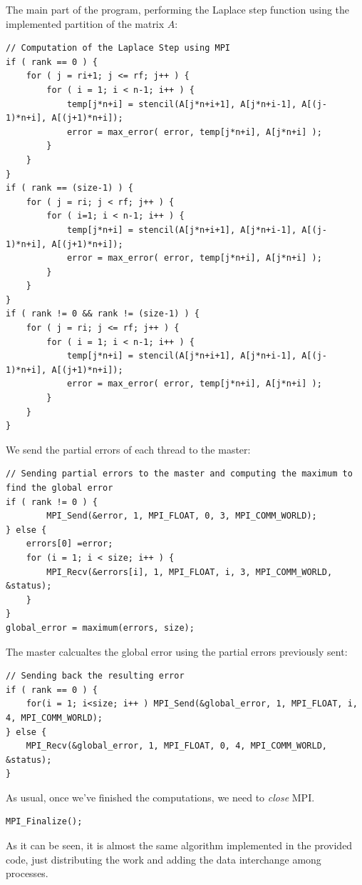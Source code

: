 The main part of the program, performing the Laplace step function using the implemented partition of the matrix $A$:
\begin{lstlisting}[firstnumber=106]
// Computation of the Laplace Step using MPI
if ( rank == 0 ) {
	for ( j = ri+1; j <= rf; j++ ) {
		for ( i = 1; i < n-1; i++ ) {
			temp[j*n+i] = stencil(A[j*n+i+1], A[j*n+i-1], A[(j-1)*n+i], A[(j+1)*n+i]);
			error = max_error( error, temp[j*n+i], A[j*n+i] );
		}
	}
}
if ( rank == (size-1) ) {
	for ( j = ri; j < rf; j++ ) {
		for ( i=1; i < n-1; i++ ) {
			temp[j*n+i] = stencil(A[j*n+i+1], A[j*n+i-1], A[(j-1)*n+i], A[(j+1)*n+i]);
			error = max_error( error, temp[j*n+i], A[j*n+i] );
		}
	}
}
if ( rank != 0 && rank != (size-1) ) {
	for ( j = ri; j <= rf; j++ ) {
		for ( i = 1; i < n-1; i++ ) {
			temp[j*n+i] = stencil(A[j*n+i+1], A[j*n+i-1], A[(j-1)*n+i], A[(j+1)*n+i]);
			error = max_error( error, temp[j*n+i], A[j*n+i] );
		}
	}
}
\end{lstlisting}

We send the partial errors of each thread to the master:
\begin{lstlisting}[firstnumber=132]
// Sending partial errors to the master and computing the maximum to find the global error
if ( rank != 0 ) {
		MPI_Send(&error, 1, MPI_FLOAT, 0, 3, MPI_COMM_WORLD);
} else {
	errors[0] =error;
	for (i = 1; i < size; i++ ) {
		MPI_Recv(&errors[i], 1, MPI_FLOAT, i, 3, MPI_COMM_WORLD, &status);
	}
}
global_error = maximum(errors, size);
\end{lstlisting}

The master calcualtes the global error using the partial errors previously sent:
\begin{lstlisting}[firstnumber=143]
// Sending back the resulting error
if ( rank == 0 ) {
	for(i = 1; i<size; i++ ) MPI_Send(&global_error, 1, MPI_FLOAT, i, 4, MPI_COMM_WORLD);
} else {
	MPI_Recv(&global_error, 1, MPI_FLOAT, 0, 4, MPI_COMM_WORLD, &status);
}
\end{lstlisting}

As usual, once we've finished the computations, we need to \emph{close} MPI.
\begin{lstlisting}[firstnumber=156]
MPI_Finalize();
\end{lstlisting}

As it can be seen, it is almost the same algorithm implemented in the provided  code, just distributing the work and adding the data interchange among processes.